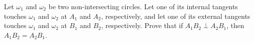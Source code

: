 Let $\omega_1$ and $\omega_2$ be two non-intersecting circles. Let one of its internal tangents touches $\omega_1$ and $\omega_2$ at $A_1$ and $A_2$, respectively, and let one of its external tangents touches $\omega_1$ and $\omega_2$ at $B_1$ and $B_2$, respectively. Prove that if $A_1B_2\perp  A_2B_1$, then   $A_1B_2 = A_2B_1$.
